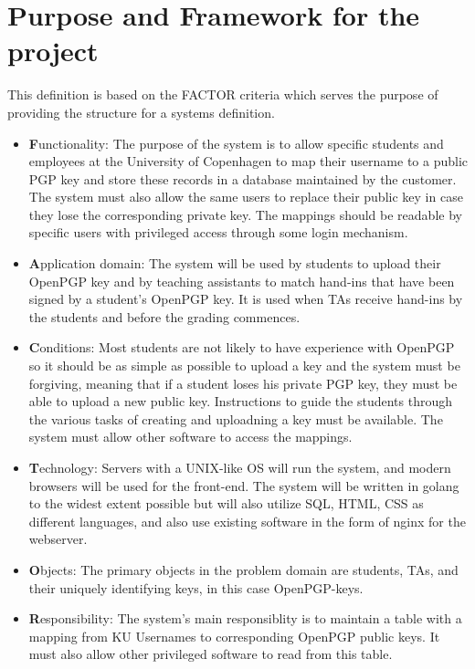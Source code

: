 \documentclass[11pt,a4paper]{report}
\begin{document}
\section{Purpose and Framework for the project}\label{sec:Purpose_Framework}
This definition is based on the FACTOR criteria which serves the purpose of providing the structure for a systems definition.
\begin{itemize}
\item \textbf{F}unctionality: The purpose of the system is to allow specific students and employees at the University of Copenhagen to map their username to a public PGP key and store these records in a database maintained by the customer. The system must also allow the same users to replace their public key in case they lose the corresponding private key. The mappings should be readable by specific users with privileged access through some login mechanism.
\item \textbf{A}pplication domain: The system will be used by students to upload their OpenPGP key and by teaching assistants to match hand-ins that have been signed by a student's OpenPGP key. It is used when TAs receive hand-ins by the students and before the grading commences.
\item \textbf{C}onditions: Most students are not likely to have experience with OpenPGP so it should be as simple as possible to upload a key and the system must be forgiving, meaning that if a student loses his private PGP key, they must be able to upload a new public key. Instructions to guide the students through the various tasks of creating and uploadning a key must be available. The system must allow other software to access the mappings.
\item \textbf{T}echnology: Servers with a UNIX-like OS will run the system, and modern browsers will be used for the front-end. The system will be written in golang to the widest extent possible but will also utilize SQL, HTML, CSS as different languages, and also use existing software in the form of nginx for the webserver.
\item \textbf{O}bjects: The primary objects in the problem domain are students, TAs, and their uniquely identifying keys, in this case OpenPGP-keys.
\item \textbf{R}esponsibility: The system's main responsiblity is to maintain a table with a mapping from KU Usernames to corresponding OpenPGP public keys. It must also allow other privileged software to read from this table.
\end{itemize}
\end{document}
